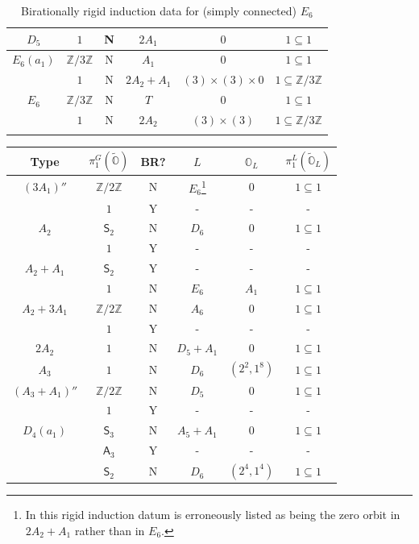 \documentclass[11pt]{amsart}
\renewcommand{\O}{{\mathbb O}}
\newcommand{\bZ}{{\mathbb Z}}
\newcommand{\Alt}{{\mathsf{A}}}
\newcommand{\Sym}{{\mathsf{S}}}
\newcommand{\covO}{\widetilde{\O}}
\numberwithin{equation}{section}
\begin{document}
\begin{center}
\begin{longtable}{|c|c|c|c|c|c|}
			\hline
			$D_5$ & $1$ & N & $2 A_1$ & $0$ & $1\subseteq 1$ \\
			\hline
			$E_6(a_1)$ & $\bZ/3\bZ$ & N & $A_1$ & $0$ & $1\subseteq 1$ \\
			& $1$ & N & $2 A_2 + A_1$ &  $(3) \times (3)\times 0$ & $1\subseteq \bZ/3\bZ$ \\
			\hline
			$E_6$ & $\bZ/3\bZ$ & N & $T$ & $0$ & $1\subseteq 1$ \\
			& $1$ & N & $2 A_2$ & $(3)\times (3)$ & $1\subseteq \bZ/3\bZ$ \\
			\hline
			\caption{Birationally rigid induction data for (simply connected) $E_6$}\label{ta: E6}
		\end{longtable}
	\end{center}
	
	\renewcommand{\arraystretch}{2}
	\begin{center}
		\begin{longtable}{|c|c|c|c|c|c|}
			\hline
			Type & $\pi_1^G(\covO)$ & BR? & $L$ & $\O_L$ & $\pi_1^L(\covO_L)$\\ \hline
			\hline
			$(3A_1)''$ & $\bZ/2\bZ$ & N & $E_6$\footnote{In \cite{EdG} this rigid induction datum is erroneously listed as being the zero orbit in $2A_2+A_1$ rather than in $E_6$.} & $0$ & $1\subseteq 1$ \\
			& $1$ & Y & - & - & - \\
			\hline
			$A_2$ & $\Sym_2$ & N & $D_6$ & $0$ & $1\subseteq 1$ \\
			& $1$ & Y & - & - & - \\
			\hline
			$A_2+A_1$ & $\Sym_2$ & Y & - & - & - \\
			& $1$ & N & $E_6$ & $A_1$ & $1\subseteq 1$\\
			\hline
			$A_2+3A_1$ & $\bZ/2\bZ$ & N & $A_6$ & $0$ & $1\subseteq 1$ \\
			& $1$ & Y & - & - & - \\
			\hline
			$2A_2$ & $1$ & N & $D_5+ A_1$ & $0$ & $1\subseteq 1$ \\
			\hline
			$A_3$ & $1$ & N & $D_6$ & $(2^2,1^8)$ & $1\subseteq 1$ \\
			\hline
			$(A_3+A_1)''$ & $\bZ/2\bZ$ & N & $D_5$ & $0$ & $1\subseteq 1$ \\
			& $1$ & Y & - & - & - \\
			\hline
			$D_4(a_1)$ & $\Sym_3$ & N & $A_5 + A_1$ & $0$ & $1\subseteq 1$ \\
			& $\Alt_3$ & Y & - & - & - \\
			& $\Sym_2$ & N & $D_6$ & $(2^4,1^4)$ & $1\subseteq 1$ \\

\end{longtable}
\end{center}
\end{document}
